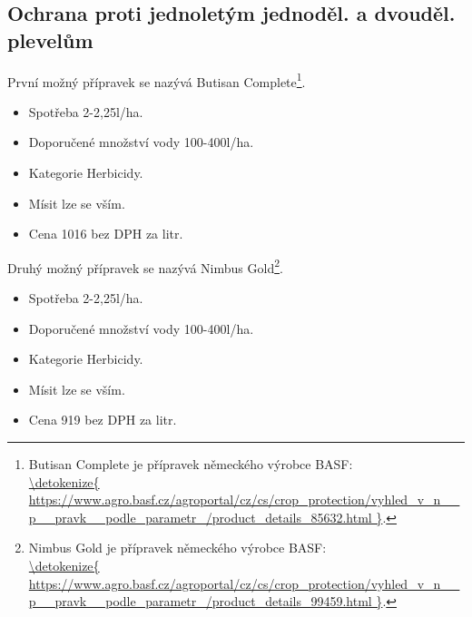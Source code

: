 \subsection{Ochrana proti jednoletým jednoděl. a dvouděl. plevelům}
První možný přípravek se nazývá Butisan Complete\footnote{Butisan Complete je přípravek německého výrobce BASF: \\\url{\detokenize{
https://www.agro.basf.cz/agroportal/cz/cs/crop_protection/vyhled_v_n__p__pravk__podle_parametr_/product_details_85632.html
}}.}.
\begin{itemize}
  \item Spotřeba 2-2,25l/ha.
  \item Doporučené množství vody 100-400l/ha.
  \item Kategorie Herbicidy.
  \item Mísit lze se vším.
  \item Cena 1016 bez DPH za litr.
\end{itemize}

Druhý možný přípravek se nazývá Nimbus Gold\footnote{Nimbus Gold je přípravek německého výrobce BASF: \\\url{\detokenize{
https://www.agro.basf.cz/agroportal/cz/cs/crop_protection/vyhled_v_n__p__pravk__podle_parametr_/product_details_99459.html
}}.}.
\begin{itemize}
  \item Spotřeba 2-2,25l/ha.
  \item Doporučené množství vody 100-400l/ha.
  \item Kategorie Herbicidy.
  \item Mísit lze se vším.
  \item Cena 919 bez DPH za litr.
\end{itemize}

